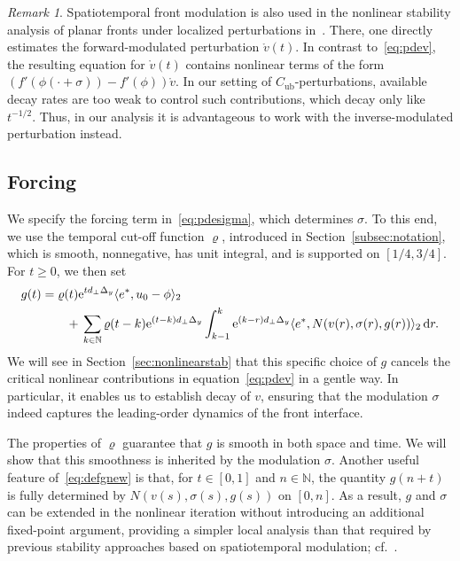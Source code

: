 \documentclass[12pt,oneside,a4paper,reqno]{amsart}
\numberwithin{equation}{section}
\theoremstyle{definition}
\theoremstyle{remark}
\newtheorem{remark}[theorem]{Remark}
\newcommand{\bbN}{{\mathbb N}}
\newcommand{\rd}{{\,\rm{d}}}
\newcommand{\Cub}{{C_{\mathrm{ub}}}}
\newcommand{\re}{{\rm e}}
\begin{document}
\begin{remark} \label{rem:invvsforward}
Spatiotemporal front modulation is also used in the nonlinear stability analysis of planar fronts under localized perturbations in~\cite{kapitula_multidimensional_1997}. There, one directly estimates the forward-modulated perturbation $\mathring{v}(t)$. In contrast to~\eqref{eq:pdev}, the resulting equation for $\mathring{v}(t)$ contains nonlinear terms of the form $\left(f'(\phi(\cdot+\sigma)) - f'(\phi)\right)\mathring{v}$. In our setting of $\Cub$-perturbations, available decay rates are too weak to control such contributions, which decay only like $t^{-1/2}$. Thus, in our analysis it is advantageous to work with the inverse-modulated perturbation instead.
\end{remark}


\subsection{Forcing}
\label{subsec:forcing}
We specify the forcing term in~\eqref{eq:pdesigma}, which determines $\sigma$. To this end, we use the temporal cut-off function $\varrho$, introduced in Section~\ref{subsec:notation}, which is smooth, nonnegative, has unit integral, and is supported on $[1/4,3/4]$. For $t \geq 0$, we then set
\begin{align} \label{eq:defgnew} 
\begin{split}
g(t) &= \varrho(t) \re^{t d_{\bot}\Delta_y} \langle e^*, u_0 - \phi \rangle_2\\ 
&\qquad + \, \sum_{k \in \bbN} \varrho(t - k)\re^{(t-k)d_{\bot}\Delta_y} \int_{k-1}^k \re^{(k-r)d_{\bot}\Delta_y} \langle e^*, N(v(r),\sigma(r),g(r))\rangle_2 \rd r . 
\end{split}
\end{align}
We will see in Section~\ref{sec:nonlinearstab} that this specific choice of $g$ cancels the critical nonlinear contributions in equation~\eqref{eq:pdev} in a gentle way. In particular, it enables us to establish decay of $v$, ensuring that the modulation $\sigma$ indeed captures the leading-order dynamics of the front interface. 

The properties of $\varrho$ guarantee that $g$ is smooth in both space and time. We will show that this smoothness is inherited by the modulation $\sigma$. Another useful feature of~\eqref{eq:defgnew} is that, for $t\in[0,1]$ and $n\in \bbN$, the quantity $g(n+t)$ is fully determined by $N(v(s),\sigma(s),g(s))$ on $[0,n]$.  As a result, $g$ and $\sigma$ can be extended in the nonlinear iteration without introducing an additional fixed-point argument, providing a simpler local analysis than that required by previous stability approaches based on spatiotemporal modulation; cf.~\cite[Appendix~B]{derijk_nonlinear_2024}.
\end{document}
